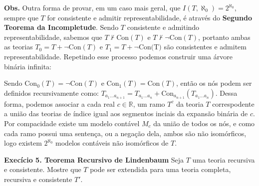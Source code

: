 \documentclass[11pt]{article}
\newcommand{\mbb}[1]{\mathbb{#1}}
\begin{document}
\begin{shaded}
\textbf{Obs.} Outra forma de provar, em um caso mais geral, que $I(T,\aleph_0)=2^{\aleph_0}$, sempre que $T$ for consistente e admitir representabilidade, é através do \textbf{Segundo Teorema da Incompletude}. Sendo $T$ consistente e admitindo representabilidade, sabemos que $T\nvdash\text{Con}(T)$ e $T\nvdash\neg\text{Con}(T)$, portanto ambas as teorias $T_0=T+\neg\text{Con}(T)$ e $T_1=T+\neg\text{Con(T)}$ são consistentes e admitem representabilidade. Repetindo esse processo podemos construir uma árvore binária infinita:

\begin{center}
\end{center}

Sendo $\text{Con}_0(T)=\neg\text{Con}(T)$ e $\text{Con}_1(T)=\text{Con}(T)$, então os nós podem ser definidos recursivamente como:
$T_{a_1\dots a_{n+1}}=T_{a_1\dots a_n}+\text{Con}_{a_{n+1}}(T_{a_1\dots a_n})$. Dessa forma, podemos associar a cada real $c\in\mbb{R}$, um ramo $T^c$ da teoria $T$ correspodente a união das teorias de índice igual aos segmentos inciais da expansão binária de $c$. Por compacidade existe um modelo contável $M_c$ da união de todos os nós, e como cada ramo possui uma sentença, ou a negação dela, ambos são não isomórficos, logo existem $2^{\aleph_0}$ modelos contáveis não isomórficos de $T$.

\end{shaded}

\begin{shaded}
\textbf{Execício 5. Teorema Recursivo de Lindenbaum} Seja $T$ uma teoria recursiva e consistente. Mostre que $T$ pode ser extendida para uma teoria completa, recursiva e consistente $T'$.
\end{shaded}
\end{document}
